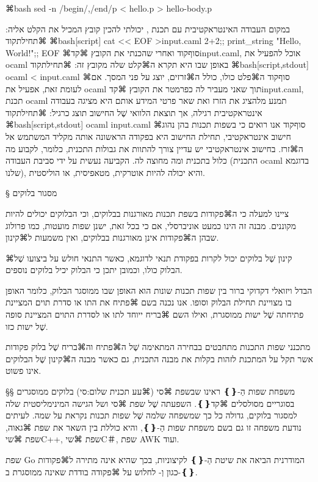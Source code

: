 ⌘bash
sed -n /begin/,/end/p < hello.p > hello-body.p
\END

במקום העבודה האינטראקטיבית עם תכנת ,
יכולתי להכין קובץ המכיל את הקלט אליה:
⌘תחילת{קוד}
⌘bash[script]
cat << EOF >input.caml
2+2;;
print_string "Hello, World!\n";;
EOF
\END
⌘סוף{קוד}
ואחרי שהכנתי את הקובץ ⌘קד{input.caml}, אוכל להפעיל את ocaml באופן שבו היא תקרא
ה⌘קלט שלה מקובץ זה:
⌘תחילת{קוד}
⌘bash[script,stdout]
ocaml < input.caml
\END
⌘סוף{קוד}
ה⌘פלט כולו, כולל ה⌘זרזים, יוצג על פני המסך. אם לעומת זאת, אפעיל את ocaml
תוך שאני מעביר לה כפרמטר את הקובץ ⌘קד{input.caml}, תכנת ocaml תמנע מלהציג
את הזרז ואת שאר פרטי המידע אותם היא מציגה בעבודה אינטראקטיבית רגילה, אך
תוצאת הלוואי שֶׁל החישוב תוצג כרגיל:
⌘תחילת{קוד}
⌘bash[script,stdout]
ocaml input.caml
\END
⌘סוף{קוד}
אנו רואים כי בשפות תכנות בהן נהוג חישוב אינטראקטיבי, תחילת החישוב היא בפקודה
הראשונה אותה מקליד המשתמש אל ה⌘זרז. בחישוב אינטראקטיבי יש עדיין צורך להתוות את גבולות התכנית,
כלומר, לקבוע מה כלול בתכנית ומה מחוצה לה. הקביעה נעשית על ידי סביבת העבודה (התכנית ocaml
בדוגמא שלנו), והיא יכולה להיות אוטרקית, מטאפיסית, או הוליסטית.

§ מסגור בלוקים

ציינו למעלה כי ה⌘פקודות בשפת תכנות מאורגנות בבלוקים, וכי הבלוקים יכולים להיות
מקוננים. מבנה זה הינו כמעט אוניברסלי, אם כי בכל זאת, ישנן שפות מועטות, כמו
פרולוג שבהן ה⌘פקודות אינן מאורגנות בבלוקים, ואין משמעות ל⌘קינון.

⌘קינון שֶׁל בלוקים יכול לקרות בפקודת תנאי לדוגמא, כאשר התנאי חולש על ביצועו שֶׁל
הבלוק כולו, וכמובן יתכן כי הבלוק יכיל בלוקים נוספים.

הבדל ויזואלי דקדוקי ברור בין שפות תכנות שונות הוא האופן שבו ממוסגר הבלוק, כלומר
האופן בו מצויינת תחילת הבלוק וסופו. אנו נכנה בשם ⌘פתיח את התו או סדרת תוים
המציינת פתיחתה שֶׁל ישות ממוסגרת, ואילו השם ⌘בריח ייוחד לתו או לסדרת התוים
המציינת סופה שֶׁל ישות כזו.

מתכנני שפות התכנות מתחבטים בבחירה המתאימה שֶׁל ה⌘פתיח וה⌘בריח שֶׁל בלוק פקודות אשר
תקל על המתכנת לזהות בקלות את מבנה התכנית, גם כאשר מבנה ה⌘קינון שֶׁל הבלוקים אינו
פשוט.

§§ משפחת שפות הַ-{❴❵}
ראינו שבשפת ⌘סי (⌘עע תכנית שלום:סי) בלוקים ממוסגרים בסוגריים מסולסלים
⌘קד{❴❵}.
השפעתה שֶׁל שפת ⌘סי ושל הגישה המינימליסטית שלה למסגור בלוקים, גדולה
כל כך שמשפחה שלמה שֶׁל שפות תכנות נקראת על שמה. לעיתים נודעת משפחה זו גם בשם
משפחת שפות הַ-{❴❵}, והיא כוללת בין השאר את שפת ⌘גאוה, שפת ⌘שי{C++}, שפת
⌘שי{C＃}, שפת AWK ועוד.

שפת Go המודרנית הביאה את שיטת הַ-{❴❵} לקיצוניות, בכך שהיא אינה מתירה ל⌘פקודות
כגון  וְ- לחלוש על ⌘פקודה בודדת שאינה ממוסגרת
ב-{❴❵}.

